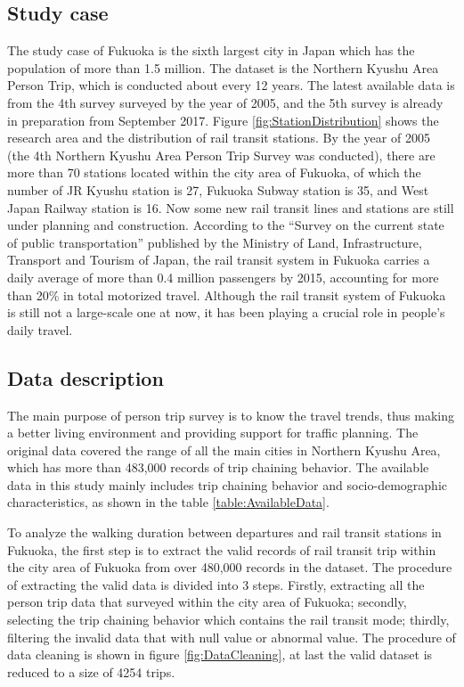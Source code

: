\documentclass[Journal,letterpaper]{ascelike-new}
\begin{document}
\subsection{Study case}
The study case of Fukuoka is the sixth largest city in Japan which has the population of more than 1.5 million. The dataset is the Northern Kyushu Area Person Trip, which is conducted about every 12 years. The latest available data is from the 4th survey surveyed by the year of 2005, and the 5th survey is already in preparation from September 2017. Figure \ref{fig:StationDistribution} shows the research area and the distribution of rail transit stations. By the year of 2005 (the 4th Northern Kyushu Area Person Trip Survey was conducted), there are more than 70 stations located within the city area of Fukuoka, of which the number of JR Kyushu station is 27, Fukuoka Subway station is 35, and West Japan Railway station is 16. Now some new rail transit lines and stations are still under planning and construction. According to the “Survey on the current state of public transportation” published by the Ministry of Land, Infrastructure, Transport and Tourism of Japan, the rail transit system in Fukuoka carries a daily average of more than 0.4 million passengers by 2015, accounting for more than 20\% in total motorized travel. Although the rail transit system of Fukuoka is still not a large-scale one at now, it has been playing a crucial role in people's daily travel.

%
\subsection{Data description}
%
The main purpose of person trip survey is to know the travel trends, thus making a better living environment and providing support for traffic planning. The original data covered the range of all the main cities in Northern Kyushu Area, which has more than 483,000 records of trip chaining behavior. The available data in this study mainly includes trip chaining behavior and socio-demographic characteristics, as shown in the table \ref{table:AvailableData}.

%
To analyze the walking duration between departures and rail transit stations in Fukuoka, the first step is to extract the valid records of rail transit trip within the city area of Fukuoka from over 480,000 records in the dataset. The procedure of extracting the valid data is divided into 3 steps. Firstly, extracting all the person trip data that surveyed within the city area of Fukuoka; secondly, selecting the trip chaining behavior which contains the rail transit mode; thirdly, filtering the invalid data that with null value or abnormal value. The procedure of data cleaning is shown in figure \ref{fig:DataCleaning}, at last the valid dataset is reduced to a size of 4254 trips.
\end{document}
